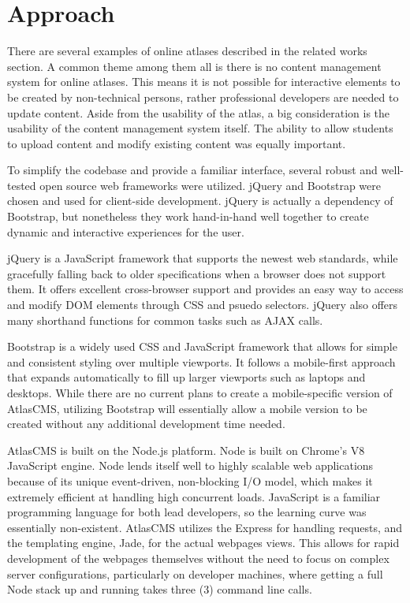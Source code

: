\documentclass[11pt, final, conference, twocolumn]{IEEEtran}
\begin{document}
\section{Approach}
There are several examples of online atlases described in the related works section. A common theme among them all is there is no content management system for online atlases.  This means it is not possible for interactive elements to be created by non-technical persons, rather professional developers are needed to update content. Aside from the usability of the atlas, a big consideration is the usability of the content management system itself.  The ability to allow students to upload content and modify existing content was equally important.

To simplify the codebase and provide a familiar interface, several robust and well-tested open source web frameworks were utilized. jQuery and Bootstrap were chosen and used for client-side development. jQuery is actually a dependency of Bootstrap, but nonetheless they work hand-in-hand well together to create dynamic and interactive experiences for the user.

jQuery is a JavaScript framework that supports the newest web standards, while gracefully falling back to older specifications when a browser does not support them.  It offers excellent cross-browser support and provides an easy way to access and modify DOM elements through CSS and psuedo selectors.  jQuery also offers many shorthand functions for common tasks such as AJAX calls.

Bootstrap is a widely used CSS and JavaScript framework that allows for simple and consistent styling over multiple viewports.  It follows a mobile-first approach that expands automatically to fill up larger viewports such as laptops and desktops. While there are no current plans to create a mobile-specific version of AtlasCMS, utilizing Bootstrap will essentially allow a mobile version to be created without any additional development time needed.

AtlasCMS is built on the Node.js platform. Node is built on Chrome's V8 JavaScript engine.  Node lends itself well to highly scalable web applications because of its unique event-driven, non-blocking I/O model, which makes it extremely efficient at handling high concurrent loads.  JavaScript is a familiar programming language for both lead developers, so the learning curve was essentially non-existent.  AtlasCMS utilizes the Express for handling requests, and the templating engine, Jade, for the actual webpages views.  This allows for rapid development of the webpages themselves without the need to focus on complex server configurations, particularly on developer machines, where getting a full Node stack up and running takes three (3) command line calls.
\end{document}
